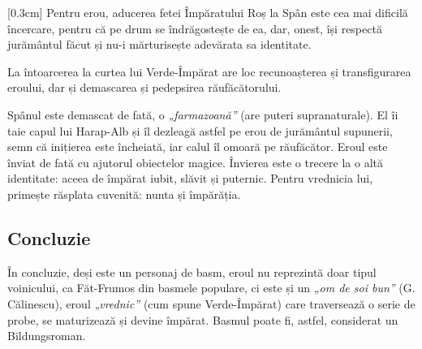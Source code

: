 \documentclass[
12pt,
a4paper
]{article}
\begin{document}
[0.3cm]
Pentru erou, aducerea fetei Împăratului Roș la Spân este cea mai dificilă încercare, pentru că pe drum se îndrăgostește de ea, dar, onest, își respectă jurământul făcut și nu-i mărturisește adevărata sa identitate.

La întoarcerea la curtea lui Verde-Împărat are loc recunoașterea și transfigurarea eroului, dar și demascarea și pedepsirea răufăcătorului.

Spânul este demascat de fată, o \textit{„farmazoană”} (are puteri supranaturale). El îi taie capul lui Harap-Alb și îl dezleagă astfel pe erou de jurământul supunerii, semn că inițierea este încheiată, iar calul îl omoară pe răufăcător. Eroul este înviat de fată cu ajutorul obiectelor magice. Învierea este o trecere la o altă identitate: aceea de împărat iubit, slăvit și puternic. Pentru vrednicia lui, primește răsplata cuvenită: nunta și împărăția.



\subsection{Concluzie}

În concluzie, deși este un personaj de basm, eroul nu reprezintă doar tipul voinicului, ca Făt-Frumos din basmele populare, ci este și un \textit{„om de soi bun”} (G. Călinescu), eroul \textit{„vrednic”} (cum spune Verde-Împărat) care traversează o serie de probe, se maturizează și devine împărat. Basmul poate fi, astfel, considerat un Bildungsroman.
\end{document}
